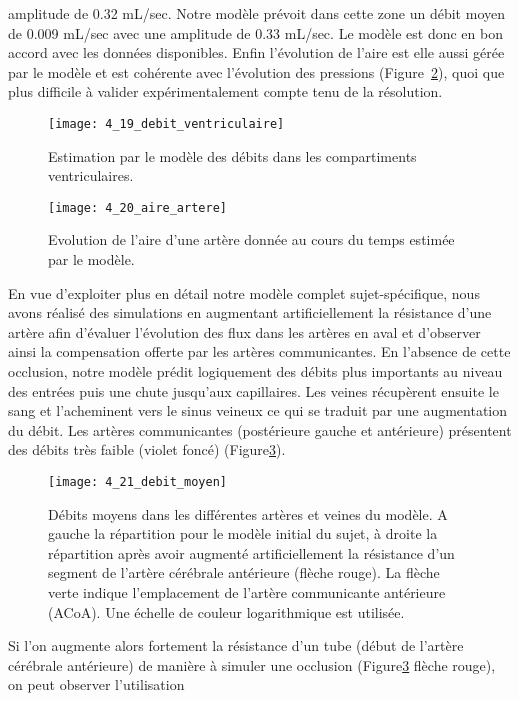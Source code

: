 amplitude de 0.32 mL/sec. Notre modèle prévoit dans cette zone un débit moyen de 0.009 mL/sec
avec une amplitude de 0.33 mL/sec. Le modèle est donc en bon accord avec les données disponibles.
Enfin l’évolution de l’aire est elle aussi gérée par le modèle et est cohérente avec l’évolution des
pressions (Figure~\ref{fig:4_20_aire_artere}), quoi que plus difficile à valider expérimentalement compte tenu de la résolution.\\
\begin{figure}[!b]
\centering
\texttt{[image: 4\_19\_debit\_ventriculaire]}
\caption{Estimation par le modèle des débits dans les compartiments ventriculaires.}
\label{fig:4_19_debit_ventriculaire}	
\end{figure}
\begin{figure}[!t]
\centering
\texttt{[image: 4\_20\_aire\_artere]}
\caption{Evolution de l'aire d'une artère donnée au cours du temps estimée par le modèle.}
\label{fig:4_20_aire_artere}	
\end{figure}
En vue d’exploiter plus en détail notre modèle complet sujet-spécifique, nous avons réalisé des
simulations en augmentant artificiellement la résistance d’une artère afin d’évaluer l’évolution des flux
dans les artères en aval et d’observer ainsi la compensation offerte par les artères communicantes. En
l’absence de cette occlusion, notre modèle prédit logiquement des débits plus importants au niveau
des entrées puis une chute jusqu’aux capillaires. Les veines récupèrent ensuite le sang et l’acheminent
vers le sinus veineux ce qui se traduit par une augmentation du débit. Les artères communicantes
(postérieure gauche et antérieure) présentent des débits très faible (violet foncé) (Figure\ref{fig:4_21_debit_moyen}).\\
\begin{figure}[!b]
\centering
\texttt{[image: 4\_21\_debit\_moyen]}
\caption{Débits moyens dans les différentes artères et veines du modèle. A gauche la répartition pour le modèle initial du
sujet, à droite la répartition après avoir augmenté artificiellement la résistance d’un segment de l’artère cérébrale
antérieure (flèche rouge). La flèche verte indique l’emplacement de l’artère communicante antérieure (ACoA). Une échelle
de couleur logarithmique est utilisée.}
\label{fig:4_21_debit_moyen}	
\end{figure}
Si l’on augmente alors fortement la résistance d’un tube (début de l’artère cérébrale
antérieure) de manière à simuler une occlusion (Figure\ref{fig:4_21_debit_moyen} flèche rouge), on peut observer l’utilisation
